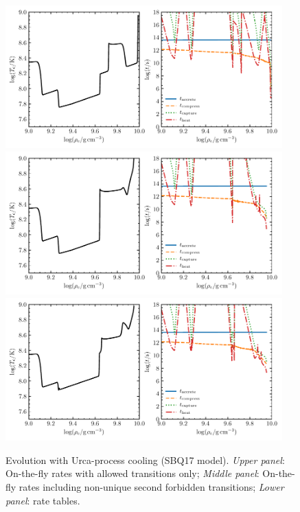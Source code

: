 \documentclass[modern]{aastex62}
\begin{document}
\begin{figure}
  \centering
  \includegraphics[width=0.95\textwidth]{SBQ17-allowed.pdf}
  \includegraphics[width=0.95\textwidth]{SBQ17-nusf11.pdf}
  \includegraphics[width=0.95\textwidth]{SBQ17-suzuki.pdf}
  \caption{Evolution with Urca-process cooling (SBQ17 model). \textit{Upper panel}: On-the-fly rates with allowed transitions only;  \textit{Middle panel}: On-the-fly rates including non-unique second forbidden transitions; \textit{Lower panel}: \citet{Suzuki2016a} rate tables. \label{fig:SBQ17}}
\end{figure}

\newpage
~
\newpage
\end{document}

